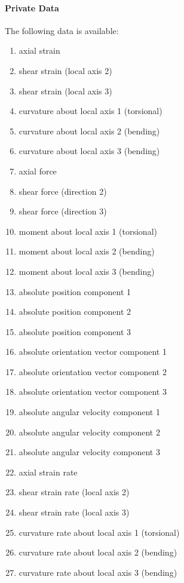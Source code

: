 \paragraph{Private Data}
\label{sec:EL:BEAM:PRIVATE}
The following data is available:
\begin{enumerate}
\item {} axial strain
\item {} shear strain (local axis 2)
\item {} shear strain (local axis 3)
\item {} curvature about local axis 1 (torsional)
\item {} curvature about local axis 2 (bending)
\item {} curvature about local axis 3 (bending)
\item {} axial force
\item {} shear force (direction 2)
\item {} shear force (direction 3)
\item {} moment about local axis 1 (torsional)
\item {} moment about local axis 2 (bending)
\item {} moment about local axis 3 (bending)
\item {} absolute position component 1
\item {} absolute position component 2
\item {} absolute position component 3
\item {} absolute orientation vector component 1
\item {} absolute orientation vector component 2
\item {} absolute orientation vector component 3
\item {} absolute angular velocity component 1
\item {} absolute angular velocity component 2
\item {} absolute angular velocity component 3
\item {} axial strain rate
\item {} shear strain rate (local axis 2)
\item {} shear strain rate (local axis 3)
\item {} curvature rate about local axis 1 (torsional)
\item {} curvature rate about local axis 2 (bending)
\item {} curvature rate about local axis 3 (bending)
\end{enumerate}
